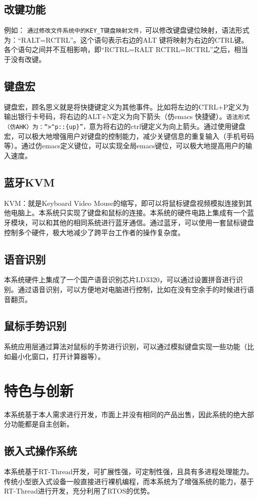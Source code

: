 \subsection{改键功能}例如：
\verb|通过修改文件系统中的KEY_T键盘映射文件，|可以修改键盘键位映射，语法形式为：“RALT=RCTRL”。这个语句表示右边的ALT 键将映射为右边的CTRL键。各个语句之间并不互相影响，即“RCTRL=RALT RCTRL=RCTRL”之后，相当于没有改键。

\subsection{键盘宏}
键盘宏，顾名思义就是将快捷键定义为其他事件。比如将左边的CTRL+P定义为输出银行卡号码，将右边的ALT+N定义为向下箭头（仿emacs 快捷键）。\verb|语法形式（仿AHK）为：“>^p::{up}”，|意为将右边的ctrl键定义为向上箭头。通过使用键盘宏，可以极大地增强用户对键盘的控制能力，减少关键信息的重复输入（手机号码等）。通过仿emacs定义键位，可以实现全局emacs键位，可以极大地提高用户的输入速度。

\subsection{蓝牙KVM}
KVM：就是Keyboard Video Mouse的缩写，即可以将鼠标键盘视频模拟连接到其他电脑上。本系统只实现了键盘和鼠标的连接。本系统的硬件电路上集成有一个蓝牙模块，可以和其他的相同系统进行蓝牙通信。通过蓝牙，可以使用一套鼠标键盘控制多个硬件，极大地减少了跨平台工作者的操作复杂度。

\subsection{语音识别}
本系统硬件上集成了一个国产语音识别芯片LD3320，可以通过设置拼音进行识别。通过语音识别，可以方便地对电脑进行控制，比如在没有空余手的时候进行语音翻页。

\subsection{鼠标手势识别}
系统应用层通过算法对鼠标的手势进行识别，可以通过模拟键盘实现一些功能（比如最小化窗口，打开计算器等）。

\section{特色与创新}
本系统基于本人需求进行开发，市面上并没有相同的产品出售，因此系统的绝大部分功能都是自主创新。
\subsection{嵌入式操作系统}
本系统基于RT-Thread开发，可扩展性强，可定制性强，且具有多进程处理能力。传统小型嵌入式设备一般直接进行裸机编程，而本系统为了增强系统的能力，基于RT-Thread进行开发，充分利用了RTOS的优势。

